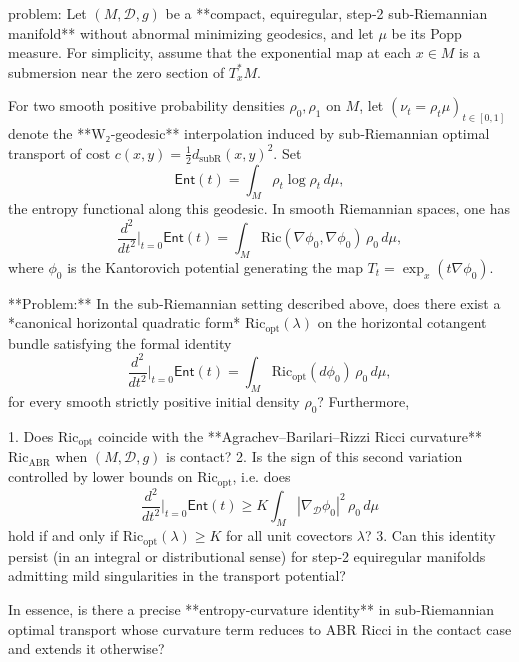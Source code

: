 problem:  
Let \((M,\mathcal D,g)\) be a **compact, equiregular, step‑2 sub‑Riemannian manifold** without abnormal minimizing geodesics, and let \(\mu\) be its Popp measure. For simplicity, assume that the exponential map at each \(x\in M\) is a submersion near the zero section of \(T_x^*M\).  

For two smooth positive probability densities \(\rho_0,\rho_1\) on \(M\), let \((\nu_t=\rho_t\mu)_{t\in[0,1]}\) denote the **W₂‑geodesic** interpolation induced by sub‑Riemannian optimal transport of cost \(c(x,y)=\tfrac12 d_{\mathrm{subR}}(x,y)^2\). Set
\[
\mathsf{Ent}(t)=\int_M \rho_t\log\rho_t \, d\mu,
\]
the entropy functional along this geodesic.  
In smooth Riemannian spaces, one has 
\[
\frac{d^2}{dt^2}\Big|_{t=0}\!\mathsf{Ent}(t)=\int_M \mathrm{Ric}(\nabla\phi_0,\nabla\phi_0)\,\rho_0\,d\mu,
\]
where \(\phi_0\) is the Kantorovich potential generating the map \(T_t=\exp_x(t\nabla\phi_0)\).  

**Problem:**  
In the sub‑Riemannian setting described above, does there exist a *canonical horizontal quadratic form* \(\mathrm{Ric}_{\mathrm{opt}}(\lambda)\) on the horizontal cotangent bundle satisfying the formal identity  
\[
\frac{d^2}{dt^2}\Big|_{t=0}\!\mathsf{Ent}(t)
   =\!\int_M\!\mathrm{Ric}_{\mathrm{opt}}(d\phi_0)\,\rho_0\,d\mu,
\]
for every smooth strictly positive initial density \(\rho_0\)?  
Furthermore,

1. Does \(\mathrm{Ric}_{\mathrm{opt}}\) coincide with the **Agrachev–Barilari–Rizzi Ricci curvature** \(\mathrm{Ric}_{\mathrm{ABR}}\) when \((M,\mathcal D,g)\) is contact?  
2. Is the sign of this second variation controlled by lower bounds on \(\mathrm{Ric}_{\mathrm{opt}}\), i.e. does
   \[
   \frac{d^2}{dt^2}\Big|_{t=0}\!\mathsf{Ent}(t)\ge K
   \int_M|\nabla_{\mathcal D}\phi_0|^2\,\rho_0\,d\mu
   \]
   hold if and only if \(\mathrm{Ric}_{\mathrm{opt}}(\lambda)\ge K\) for all unit covectors \(\lambda\)?
3. Can this identity persist (in an integral or distributional sense) for step‑2 equiregular manifolds admitting mild singularities in the transport potential?

In essence, is there a precise **entropy‑curvature identity** in sub‑Riemannian optimal transport whose curvature term reduces to ABR Ricci in the contact case and extends it otherwise?

